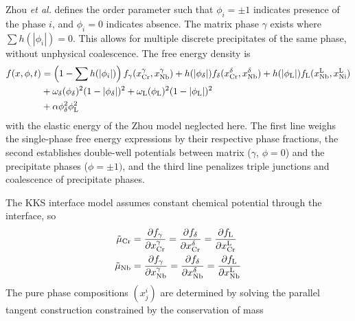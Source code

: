 \documentclass[10pt]{article}
\begin{document}
		Zhou \emph{et al.} \cite{Zhou2014} defines the order parameter such that $\phi_i=\pm1$ indicates presence of the phase $i$, and $\phi_i=0$ indicates absence.
		The matrix phase $\gamma$ exists where $\sum h(|\phi_i|)=0$. This allows for multiple discrete precipitates of the same phase, without unphysical coalescence.
		The free energy density is
		\begin{align}
		    \nonumber
			f(x,\phi,t) &= \left( 1-\sum h(|\phi_i|) \right) f_{\gamma}(x_{\ce{Cr}}^{\gamma},x_{\ce{Nb}}^{\gamma})
			             + h(|\phi_{\delta}|) f_{\delta}(x_{\ce{Cr}}^{\delta},x_{\ce{Nb}}^{\delta})
			   		     + h(|\phi_{\ce{L}}|)f_{\ce{L}}(x_{\ce{Nb}}^{\ce{L}},x_{\ce{Ni}}^{\ce{L}})\\
		    \nonumber
			            &+ \omega_{\delta}(\phi_{\delta})^2(1-|\phi_{\delta}|)^2
			             + \omega_{\ce{L}}(\phi_{\ce{L}})^2(1-|\phi_{\ce{L}}|)^2\\
			            &+ \alpha\phi_{\delta}^2\phi_{\ce{L}}^2
			            \label{eqn:density}
		\end{align}
		with the elastic energy of the Zhou model neglected here.
		The first line weighs the single-phase free energy expressions by their respective phase fractions,
		the second establishes double-well potentials between matrix ($\gamma$, $\phi=0$) and the precipitate phases ($\phi=\pm1)$,
		and the third line penalizes triple junctions and coalescence of precipitate phases.

		The KKS interface model \cite{Kim1999} assumes constant chemical potential through the interface, so
		\begin{align}
			\label{eqn:potcr}
			\tilde{\mu}_{\ce{Cr}} &= \frac{\partial f_{\gamma}}{\partial x_{\ce{Cr}}^{\gamma}}
			                       = \frac{\partial f_{\delta}}{\partial x_{\ce{Cr}}^{\delta}}
			                       = \frac{\partial f_{\ce{L}}}{\partial x_{\ce{Cr}}^{\ce{L}}}\\
			\label{eqn:potnb}
			\tilde{\mu}_{\ce{Nb}} &= \frac{\partial f_{\gamma}}{\partial x_{\ce{Nb}}^{\gamma}}
			                       = \frac{\partial f_{\delta}}{\partial x_{\ce{Nb}}^{\delta}}
			                       = \frac{\partial f_{\ce{L}}}{\partial x_{\ce{Nb}}^{\ce{L}}}
		\end{align}
		The pure phase compositions $\left(x_j^i\right)$ are determined by solving the parallel tangent construction constrained by the
		conservation of mass
\end{document}
